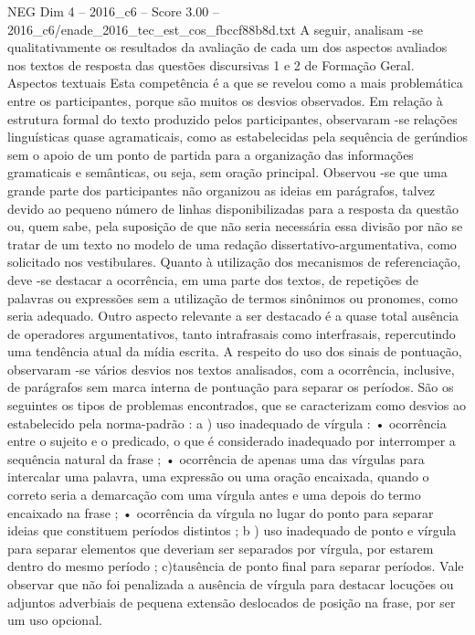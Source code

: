 \begin{textsample}{NEG Dim 4 – 2016\_c6 – Score 3.00 – 2016\_c6/enade\_2016\_tec\_est\_cos\_fbccf88b8d.txt}
A seguir, analisam -se qualitativamente os resultados da avaliação de cada um dos aspectos avaliados nos textos de resposta das questões discursivas 1 e 2 de Formação Geral.
Aspectos textuais Esta competência é a que se revelou como a mais problemática entre os participantes, porque são muitos os desvios observados.
Em relação à estrutura formal do texto produzido pelos participantes, observaram -se relações linguísticas quase agramaticais, como as estabelecidas pela sequência de gerúndios sem o apoio de um ponto de partida para a organização das informações gramaticais e semânticas, ou seja, sem oração principal.
Observou -se que uma grande parte dos participantes não organizou as ideias em parágrafos, talvez devido ao pequeno número de linhas disponibilizadas para a resposta da questão ou, quem sabe, pela suposição de que não seria necessária essa divisão por não se tratar de um texto no modelo de uma redação dissertativo-argumentativa, como solicitado nos vestibulares.
Quanto à utilização dos mecanismos de referenciação, deve -se destacar a ocorrência, em uma parte dos textos, de repetições de palavras ou expressões sem a utilização de termos sinônimos ou pronomes, como seria adequado.
Outro aspecto relevante a ser destacado é a quase total ausência de operadores argumentativos, tanto intrafrasais como interfrasais, repercutindo uma tendência atual da mídia escrita.
A respeito do uso dos sinais de pontuação, observaram -se vários desvios nos textos analisados, com a ocorrência, inclusive, de parágrafos sem marca interna de pontuação para separar os períodos.
São os seguintes os tipos de problemas encontrados, que se caracterizam como desvios ao estabelecido pela norma-padrão : a ) uso inadequado de vírgula : • ocorrência entre o sujeito e o predicado, o que é considerado inadequado por interromper a sequência natural da frase ; • ocorrência de apenas uma das vírgulas para intercalar uma palavra, uma expressão ou uma oração encaixada, quando o correto seria a demarcação com uma vírgula antes e uma depois do termo encaixado na frase ; • ocorrência da vírgula no lugar do ponto para separar ideias que constituem períodos distintos ; b ) uso inadequado de ponto e vírgula para separar elementos que deveriam ser separados por vírgula, por estarem dentro do mesmo período ; c)tausência de ponto final para separar períodos.
Vale observar que não foi penalizada a ausência de vírgula para destacar locuções ou adjuntos adverbiais de pequena extensão deslocados de posição na frase, por ser um uso opcional.

\end{textsample}
